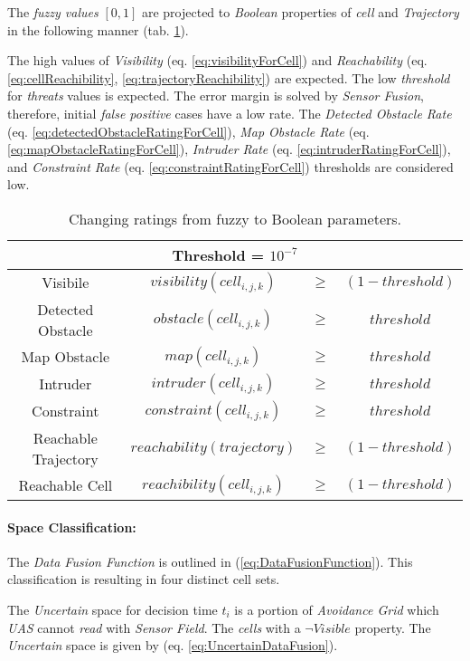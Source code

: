 The \emph{fuzzy values} $[0,1]$ are projected to \emph{Boolean} properties of \emph{cell} and \emph{Trajectory} in the following manner (tab. \ref{tab:defuzificationRatings}).


The high values of \emph{Visibility} (eq. \ref{eq:visibilityForCell}) and \emph{Reachability} (eq. \ref{eq:cellReachibility}, \ref{eq:trajectoryReachibility}) are expected. The low \emph{threshold} for \emph{threats} values is expected. The error margin is solved by \emph{Sensor Fusion}, therefore, initial \emph{false positive} cases have a low rate. The \emph{Detected Obstacle Rate} (eq. \ref{eq:detectedObstacleRatingForCell}), \emph{Map Obstacle Rate} (eq. \ref{eq:mapObstacleRatingForCell}), \emph{Intruder Rate} (eq. \ref{eq:intruderRatingForCell}), and \emph{Constraint Rate} (eq. \ref{eq:constraintRatingForCell}) thresholds are considered low.

\begin{table}[H]
    \centering
    \begin{tabular}{c|ccc}
        \multicolumn{4}{c}{Threshold = $10^{-7}$}\\\hline\hline
        Visibile & $visibility(cell_{i,j,k})$&$\ge$&$(1-threshold)$ \\\hline
        Detected Obstacle &  $obstacle(cell_{i,j,k}) $&$ \ge $&$ threshold$\\\hline
        Map Obstacle &  $map(cell_{i,j,k})$&$\ge$&$threshold$\\\hline
        Intruder &  $intruder(cell_{i,j,k})$&$\ge$&$threshold$\\\hline
        Constraint &  $constraint(cell_{i,j,k})$&$\ge$&$threshold$\\\hline\hline
        Reachable Trajectory &  $reachability(trajectory)$&$\ge$&$(1-threshold)$\\\hline
        Reachable Cell &  $reachibility(cell_{i,j,k})$&$\ge$&$(1-threshold)$
    \end{tabular}
    \caption{Changing ratings from fuzzy to Boolean parameters.}
    \label{tab:defuzificationRatings}
\end{table}


\paragraph{Space Classification:} The \emph{Data Fusion Function} is outlined in (\ref{eq:DataFusionFunction}). This classification is resulting in four distinct cell sets.

The \emph{Uncertain} space for decision time $t_i$ is a portion of \emph{Avoidance Grid} which \emph{UAS} cannot \emph{read} with \emph{Sensor Field}. The \emph{cells} with a $\neg Visible$ property. The \emph{Uncertain} space is given by (eq. \ref{eq:UncertainDataFusion}).

